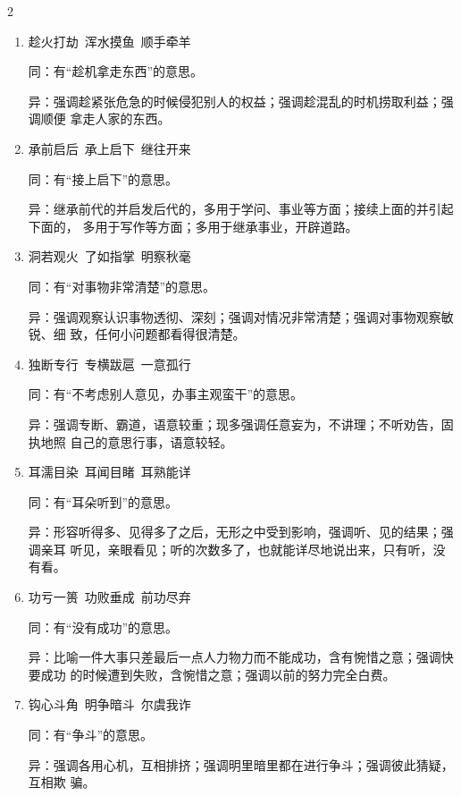 \documentclass[final,oneside]{ctexbook}
\begin{document}
\begin{multicols}{2}
\begin{enumerate}
      异：重在强调远行艰辛；重在强调长途奔波劳累；重在强调野外食宿艰难。

    \item 趁火打劫~浑水摸鱼~顺手牵羊

      同：有“趁机拿走东西”的意思。

      异：强调趁紧张危急的时候侵犯别人的权益；强调趁混乱的时机捞取利益；强调顺便
      拿走人家的东西。

    \item 承前启后~承上启下~继往开来

      同：有“接上启下”的意思。

      异：继承前代的并启发后代的，多用于学问、事业等方面；接续上面的并引起下面的，
      多用于写作等方面；多用于继承事业，开辟道路。

    \item 洞若观火~了如指掌~明察秋毫

      同：有“对事物非常清楚”的意思。

      异：强调观察认识事物透彻、深刻；强调对情况非常清楚；强调对事物观察敏锐、细
      致，任何小问题都看得很清楚。

    \item 独断专行~专横跋扈~一意孤行

      同：有“不考虑别人意见，办事主观蛮干”的意思。

      异：强调专断、霸道，语意较重；现多强调任意妄为，不讲理；不听劝告，固执地照
      自己的意思行事，语意较轻。

    \item 耳濡目染~耳闻目睹~耳熟能详

      同：有“耳朵听到”的意思。

      异：形容听得多、见得多了之后，无形之中受到影响，强调听、见的结果；强调亲耳
      听见，亲眼看见；听的次数多了，也就能详尽地说出来，只有听，没有看。

    \item 功亏一篑~功败垂成~前功尽弃

      同：有“没有成功”的意思。

      异：比喻一件大事只差最后一点人力物力而不能成功，含有惋惜之意；强调快要成功
      的时候遭到失败，含惋惜之意；强调以前的努力完全白费。

    \item 钩心斗角~明争暗斗~尔虞我诈

      同：有“争斗”的意思。

      异：强调各用心机，互相排挤；强调明里暗里都在进行争斗；强调彼此猜疑，互相欺
      骗。


\end{enumerate}
\end{multicols}
\end{document}
